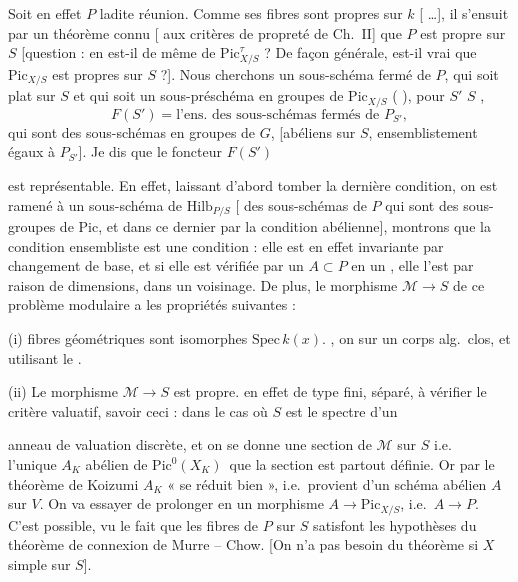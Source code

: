 \documentclass[11pt,a4paper]{article}
\begin{document}
Soit en effet $P$ ladite réunion. Comme ses fibres sont propres sur $k$
[ …], il s'ensuit par un théorème connu
[ aux critères de propreté de Ch.~II] que $P$ est
propre sur $S$ [question : en est-il de même de
$\mathrm{Pic}^{\tau}_{X/S}$ ? De façon générale, est-il vrai que
$\mathrm{Pic}_{X/S}$ est  
   propres sur $S$ ?].
Nous cherchons un sous-schéma fermé de $P$, qui soit plat sur $S$ et qui
soit un sous-préschéma en groupes de $\mathrm{Pic}_{X/S}$
(\struck{\ill{}} \ill{}), pour $S'$  $S$
,
\[
  F(S') = \text{l'ens.\ des sous-schémas fermés de } P_{S'} ,
\]
qui sont des sous-schémas en groupes de $G$, [abéliens sur $S$,
ensemblistement égaux à $P_{S'}$]. Je dis que le foncteur $F(S')$

est représentable. En effet, laissant d'abord tomber la dernière
condition, on est ramené à un sous-schéma  de
$\mathrm{Hilb}_{P/S}$ [ des sous-schémas
 de $P$ qui sont des sous-groupes de
$\mathrm{Pic}$, et  dans ce dernier par la condition
abélienne], montrons que la condition ensembliste est une condition
 : elle est en effet invariante par changement de base,
et si elle est vérifiée par un $A \subset P$ en un , elle
l'est par raison de dimensions, dans un voisinage. De plus, le morphisme
$\mathcal{M} \to S$ de ce problème modulaire a les propriétés suivantes :

(i)   fibres géométriques sont isomorphes
 \struck{\ill{}} $\mathrm{Spec}\, k(x)$.
, on  sur un corps alg.\ clos, et
utilisant le .

(ii) Le morphisme $\mathcal{M} \to S$ est propre.  en
effet de type fini, séparé,  à vérifier le critère
valuatif, savoir ceci : dans le cas où $S$ est le spectre d'un

anneau de valuation discrète, et  on se donne une section
 de $\mathcal{M}$ sur $S$ i.e.\ 
 l'unique $A_K$ abélien  de
$\mathrm{Pic}^0(X_K)$\,\ill{}  que la section est partout
définie. Or par le théorème de Koizumi $A_K$ « se réduit bien », i.e.\
provient d'un schéma abélien $A$ sur $V$. On va essayer de prolonger
\struck{\ill{}} en un morphisme $A \to \mathrm{Pic}_{X/S}$, i.e.\
$A \to P$. C'est possible, vu le fait que les fibres de $P$ sur $S$
satisfont les hypothèses du théorème de connexion
\add{interligne : \uncertain{linéaire}} de Murre -- Chow. [On n'a pas
besoin du théorème si $X$ simple sur $S$].
\end{document}
